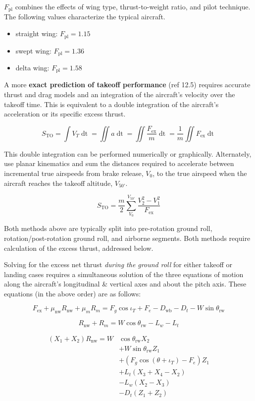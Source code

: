 \documentclass[
]{book}
\providecommand{\tightlist}{%
  \setlength{\itemsep}{0pt}\setlength{\parskip}{0pt}}
\begin{document}
\(F_{\text{pl}}\) combines the effects of wing type, thrust-to-weight ratio, and pilot technique.
The following values characterize the typical aircraft.

\begin{itemize}
\tightlist
\item
  straight wing: \(F_{\text{pl}} = 1.15\)
\item
  swept wing: \(F_{\text{pl}} = 1.36\)
\item
  delta wing: \(F_{\text{pl}} = 1.58\)
\end{itemize}

A more \textbf{exact prediction of takeoff performance} (ref 12.5) requires accurate thrust and drag models and an integration of the aircraft's velocity over the takeoff time.
This is equivalent to a double integration of the aircraft's acceleration or its specific excess thrust.

\[
S_{\mathrm{TO}} = \int V_T \mathop{dt} = \iint a \mathop{dt} = \iint \frac{F_{\text{ex}}}{m} \mathop{dt} = \frac{1}{m} \iint F_{\text{ex}} \mathop{dt}
\label{eq:s-to-fpl}
\]

This double integration can be performed numerically or graphically.
Alternately, use planar kinematics and sum the distances required to accelerate between incremental true airspeeds from brake release, \(V_0\), to the true airspeed when the aircraft reaches the takeoff altitude, \(V_{50'}\).

\[
S_{\mathrm{TO}} = \frac{m}{2} \sum_{V_0}^{V_{50'}} \frac{V_2^2 - V_1^2}{F_{\text{ex}}}
\label{eq:to-dist}
\]

Both methods above are typically split into pre-rotation ground roll, rotation/post-rotation ground roll, and airborne segments.
Both methods require calculation of the excess thrust, addressed below.

Solving for the excess net thrust \emph{during the ground roll} for either takeoff or landing cases requires a simultaneous solution of the three equations of motion along the aircraft's longitudinal \& vertical axes and about the pitch axis.
These equations (in the above order) are as follows:

\[
F_{\text{ex}}+ \mu_{\text{nw}} R_{\text{nw}} + \mu_m R_m = F_g \cos \iota_T + F_e - D_{\text{wb}} - D_t - W \sin \theta_{\text{rw}}
\label{eq:eom-x}
\]

\[
R_{\text{nw}} + R_m = W \cos \theta_{\text{rw}} - L_w - L_t
\label{eq:eom-z}
\]

\[
\begin{split}
\left( X_1 + X_2 \right) R_{\text{nw}} = W& \cos \theta_{\text{rw}} X_2 \\
&+ W \sin \theta_{\text{rw}} Z_1 \\
&+ \left( F_g \cos \left( \theta + \iota_T \right) - F_e \right) Z_1 \\
&+ L_t \left( X_3 + X_4 - X_2 \right) \\&- L_w \left( X_2 - X_3 \right) \\
&- D_t \left( Z_1 + Z_2 \right)
\end{split}
\label{eq:eom-pitch}
\]
\end{document}
